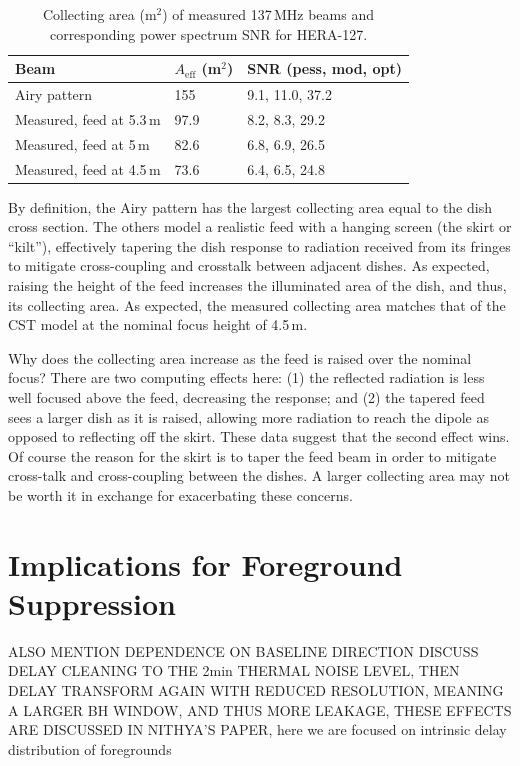 \documentclass{emulateapj}
\begin{document}
 \begin{table}[h]
 \caption{ \label{table:collectingareatable}Collecting area (m$^2$) of measured 137\,MHz beams and corresponding power spectrum SNR for HERA-127.}
\begin{tabular}{| l | l | l |}
\hline
Beam & $A_\text{eff}$ (m$^2$) & SNR (pess, mod, opt)\\
\hline
  Airy pattern & 155 & 9.1, 11.0, 37.2  \\
    Measured, feed at 5.3\,m & 97.9 & 8.2, 8.3, 29.2 \\
    Measured, feed at 5\,m & 82.6 & 6.8, 6.9, 26.5 \\
    Measured, feed at 4.5\,m & 73.6 & 6.4, 6.5, 24.8 \\ 
  \hline
\end{tabular}
\end{table}

By definition, the Airy pattern has the largest collecting area equal to the dish cross section. The others model a realistic feed with a hanging screen (the skirt or ``kilt''), effectively tapering the dish response to radiation received from its fringes to mitigate cross-coupling and crosstalk between adjacent dishes. As expected, raising the height of the feed increases the illuminated area of the dish, and thus, its collecting area. As expected, the measured collecting area matches that of the CST model at the nominal focus height of 4.5\,m.

Why does the collecting area increase as the feed is raised over the nominal focus? There are two computing effects here: (1) the reflected radiation is less well focused above the feed, decreasing the response; and (2) the tapered feed sees a larger dish as it is raised, allowing more radiation to reach the dipole as opposed to reflecting off the skirt. These data suggest that the second effect wins. Of course the reason for the skirt is to taper the feed beam in order to mitigate cross-talk and cross-coupling between the dishes. A larger collecting area may not be worth it in exchange for exacerbating these concerns.

\section{Implications for Foreground Suppression}
\label{sec:foregrounds}

ALSO MENTION DEPENDENCE ON BASELINE DIRECTION
DISCUSS DELAY CLEANING TO THE 2min THERMAL NOISE LEVEL, THEN DELAY TRANSFORM AGAIN WITH REDUCED RESOLUTION, MEANING A LARGER BH WINDOW, AND THUS MORE LEAKAGE, THESE EFFECTS ARE DISCUSSED IN NITHYA'S PAPER, here we are focused on intrinsic delay distribution of foregrounds
\end{document}
